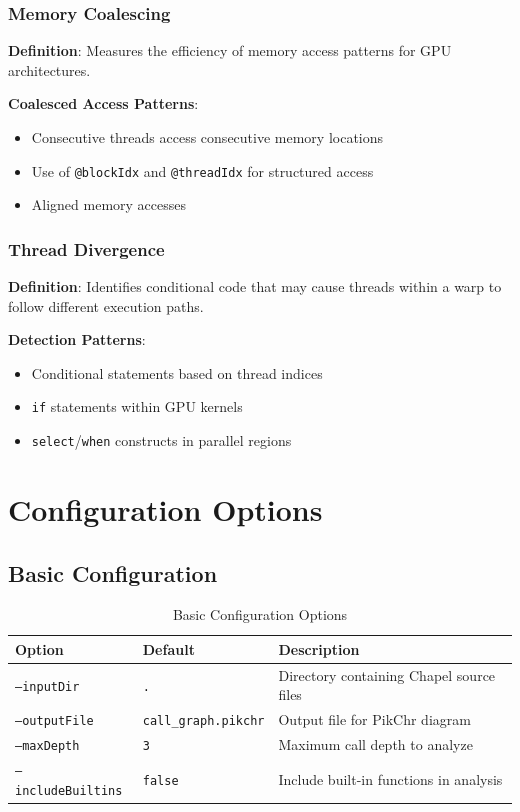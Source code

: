 \documentclass[11pt,a4paper]{article}
\begin{document}
\subsubsection{Memory Coalescing}

\textbf{Definition}: Measures the efficiency of memory access patterns for GPU architectures.

\textbf{Coalesced Access Patterns}:
\begin{itemize}
    \item Consecutive threads access consecutive memory locations
    \item Use of \texttt{@blockIdx} and \texttt{@threadIdx} for structured access
    \item Aligned memory accesses
\end{itemize}

\subsubsection{Thread Divergence}

\textbf{Definition}: Identifies conditional code that may cause threads within a warp to follow different execution paths.

\textbf{Detection Patterns}:
\begin{itemize}
    \item Conditional statements based on thread indices
    \item \texttt{if} statements within GPU kernels
    \item \texttt{select}/\texttt{when} constructs in parallel regions
\end{itemize}

\section{Configuration Options}

\subsection{Basic Configuration}

\begin{table}[H]
\centering
\begin{tabular}{@{}llp{6cm}@{}}
\toprule
\textbf{Option} & \textbf{Default} & \textbf{Description} \\
\midrule
\texttt{--inputDir} & \texttt{.} & Directory containing Chapel source files \\
\texttt{--outputFile} & \texttt{call\_graph.pikchr} & Output file for PikChr diagram \\
\texttt{--maxDepth} & \texttt{3} & Maximum call depth to analyze \\
\texttt{--includeBuiltins} & \texttt{false} & Include built-in functions in analysis \\
\bottomrule
\end{tabular}
\caption{Basic Configuration Options}
\end{table}
\end{document}
